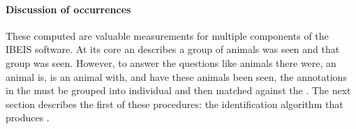 \paragraph{Discussion of occurrences}
These computed \occurrences{} are valuable measurements for multiple
  components of the IBEIS software.
At its core an \occurrence{} describes  a group of animals
  was seen and  that group was seen.
However, to answer the questions like  animals there
  were,  an animal is,  is an animal with,
  and  have these animals been seen, the annotations
  in the \occurrence{} must be grouped into individual \encounters{} and
  then matched against the \masterdatabase{}.
The next section describes the first of these procedures:
the \intraoccurrence{} identification algorithm that produces
  \encounters{}.
